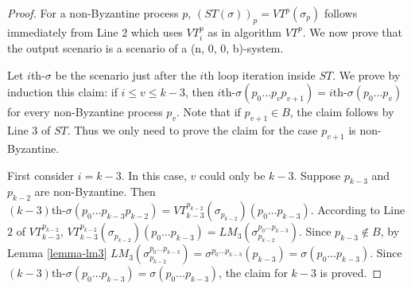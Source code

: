 \documentclass[11pt,conference,compsoc,onecolumn,romanappendices]{IEEEtran}
\newcommand{\nin}{\not\in}
\begin{document}
\begin{proof}
  For a non-Byzantine process $p$, $(S T(\sigma))_p = V T^p (\sigma_p)$ follows immediately
  from Line $2$ which uses $V T^p_i$ as in algorithm $V T^p$. We now prove that
  the output scenario is a scenario of a (n, 0, 0, b)-system.

  Let $i$th-$\sigma$ be the scenario just after the $i$th loop iteration inside $S T$.
  We prove by induction this claim: if $i \leqslant v \leqslant k - 3$, then
  $i$th-$\sigma (p_0 \ldots p_v p_{v + 1}) = i \text{th-} \sigma (p_0 \ldots
  p_v)$ for every non-Byzantine process $p_v$. Note that if $p_{v + 1} \in B$, the claim
  follows by Line $3$ of $S T$. Thus we only need to prove the claim for the case $p_{v + 1}$ is non-Byzantine.
  
  First consider $i = k - 3$. In this case, $v$ could only be $k - 3$. Suppose
  $p_{k - 3}$ and $p_{k - 2}$ are non-Byzantine. Then $(k - 3) \text{th-} \sigma (p_0
  \ldots p_{k - 3} p_{k - 2}) = V T_{k - 3}^{p_{k - 2}} (\sigma_{p_{k - 2}}) (p_0
  \ldots p_{k - 3})$. According to Line $2$ of $V T_{k - 3}^{p_{k - 2}}$, $V
  T_{k - 3}^{p_{k - 2}} (\sigma_{p_{k - 2}}) (p_0 \ldots p_{k - 3}) = L M_3
  (\sigma_{p_{k - 2}}^{p_0 \ldots p_{k - 3}})$. Since $p_{k - 3} \nin B$, by
  Lemma \ref{lemma-lm3} $L M_3 (\sigma_{p_{k - 2}}^{p_0
  \ldots p_{k - 3}}) = \sigma^{p_0 \ldots p_{k - 3}} (p_{k - 3}) = \sigma (p_0
  \ldots p_{k - 3})$. Since $(k - 3) \text{th-} \sigma (p_0 \ldots p_{k - 3}) =
  \sigma (p_0 \ldots p_{k - 3})$, the claim for $k - 3$ is proved.
  

\end{proof}
\end{document}
